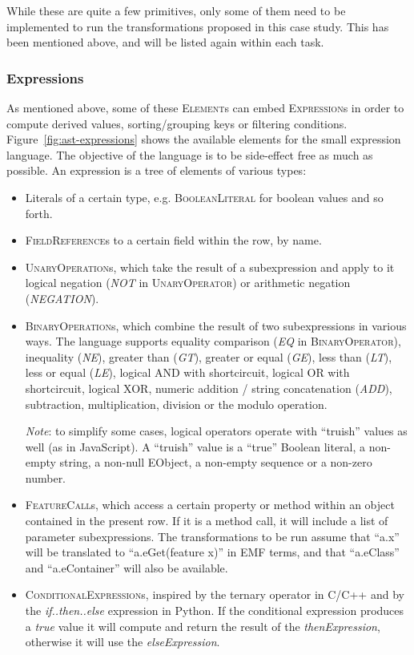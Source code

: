 \documentclass[a4paper]{scrartcl}
\newcommand*{\class}[1]{\textsc{#1}}
\begin{document}
While these are quite a few primitives, only some of them need to be
implemented to run the transformations proposed in this case
study. This has been mentioned above, and will be listed again within
each task.

\subsubsection{Expressions}

As mentioned above, some of these \class{Element}s can embed
\class{Expression}s in order to compute derived values,
sorting/grouping keys or filtering
conditions. Figure~\ref{fig:ast-expressions} shows the available
elements for the small expression language. The objective of the
language is to be side-effect free as much as possible. An expression
is a tree of elements of various types:

\begin{itemize}
\item Literals of a certain type, e.g. \class{BooleanLiteral} for
  boolean values and so forth.

\item \class{FieldReference}s to a certain field within the row, by
  name.

\item \class{UnaryOperation}s, which take the result of a
  subexpression and apply to it logical negation (\emph{NOT} in
  \class{UnaryOperator}) or arithmetic negation (\emph{NEGATION}).

\item \class{BinaryOperation}s, which combine the result of two
  subexpressions in various ways. The language supports equality
  comparison (\emph{EQ} in \class{BinaryOperator}), inequality
  (\emph{NE}), greater than (\emph{GT}), greater or equal (\emph{GE}),
  less than (\emph{LT}), less or equal (\emph{LE}), logical AND with
  shortcircuit, logical OR with shortcircuit, logical XOR, numeric
  addition / string concatenation (\emph{ADD}), subtraction,
  multiplication, division or the modulo operation.

  \emph{Note}: to simplify some cases, logical operators operate with
  ``truish'' values as well (as in JavaScript). A ``truish'' value is
  a ``true'' Boolean literal, a non-empty string, a non-null EObject,
  a non-empty sequence or a non-zero number.

\item \class{FeatureCall}s, which access a certain property or method
  within an object contained in the present row. If it is a method
  call, it will include a list of parameter subexpressions. The
  transformations to be run assume that ``a.x'' will be translated to
  ``a.eGet(feature x)'' in EMF terms, and that ``a.eClass'' and
  ``a.eContainer'' will also be available.

\item \class{ConditionalExpression}s, inspired by the ternary operator
  in C/C++ and by the \emph{if..then..else} expression in Python. If
  the conditional expression produces a \emph{true} value it will
  compute and return the result of the \emph{thenExpression},
  otherwise it will use the \emph{elseExpression}.
\end{itemize}
\end{document}
